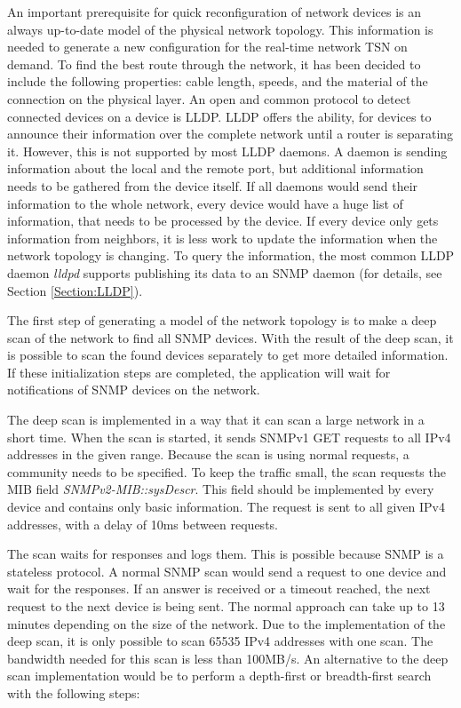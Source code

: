\label{Section:Concept}

An important prerequisite for quick reconfiguration of network devices is an always up-to-date model of the physical network topology. This information is needed to generate a new configuration for the real-time network TSN on demand. To find the best route through the network, it has been decided to include the following properties: cable length, speeds, and the material of the connection on the physical layer. An open and common protocol to detect connected devices on a device is LLDP. LLDP offers the ability, for devices to announce their information over the complete network until a router is separating it. However, this is not supported by most LLDP daemons. A daemon is sending information about the local and the remote port, but additional information needs to be gathered from the device itself. If all daemons would send their information to the whole network, every device would have a huge list of information, that needs to be processed by the device. If every device only gets information from neighbors, it is less work to update the information when the network topology is changing. To query the information, the most common LLDP daemon \textit{lldpd} supports publishing its data to an SNMP daemon (for details, see Section \ref{Section:LLDP}).

The first step of generating a model of the network topology is to make a deep scan of the network to find all SNMP devices. With the result of the deep scan, it is possible to scan the found devices separately to get more detailed information. If these initialization steps are completed, the application will wait for notifications of SNMP devices on the network.

The deep scan is implemented in a way that it can scan a large network in a short time. When the scan is started, it sends SNMPv1 GET requests to all IPv4 addresses in the given range. Because the scan is using normal requests, a community needs to be specified. To keep the traffic small, the scan requests the MIB field \textit{SNMPv2-MIB::sysDescr}. This field should be implemented by every device and contains only basic information. The request is sent to all given IPv4 addresses, with a delay of 10ms between requests.

The scan waits for responses and logs them. This is possible because SNMP is a stateless protocol. A normal SNMP scan would send a request to one device and wait for the responses. If an answer is received or a timeout reached, the next request to the next device is being sent. The normal approach can take up to 13 minutes depending on the size of the network. Due to the implementation of the deep scan, it is only possible to scan 65535 IPv4 addresses with one scan. The bandwidth needed for this scan is less than 100MB/s. An alternative to the deep scan implementation would be to perform a depth-first or breadth-first search with the following steps:

